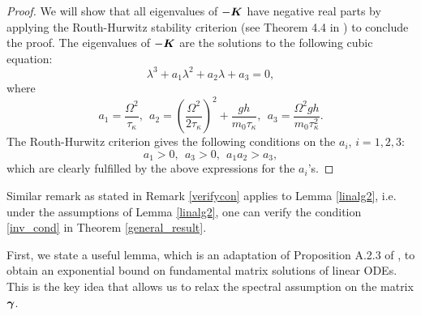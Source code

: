\begin{proof}
We will show that all eigenvalues of $-\boldsymbol{K}$ have negative real parts by applying the Routh-Hurwitz stability criterion (see Theorem 4.4 in \cite{allen2007introduction}) to conclude the proof. The eigenvalues of $-\boldsymbol{K}$ are the solutions to the following cubic equation:
\begin{equation}\lambda^3 + a_{1} \lambda^2 + a_{2} \lambda + a_{3} = 0, \end{equation}
where \begin{equation}a_{1} = \frac{\Omega^2}{\tau_{\kappa}}, \ \ a_{2} = \left(\frac{\Omega^2}{2\tau_{\kappa}}\right)^2 + \frac{gh}{m_{0}\tau_{\kappa}}, \ \ a_{3} = \frac{\Omega^2 gh}{m_{0}\tau_{\kappa}^2}.\end{equation}
The Routh-Hurwitz criterion gives the following conditions on the $a_{i}$, $i=1,2,3$: 
\begin{equation}a_{1} > 0, \ \ a_{3} > 0, \ \ a_{1}a_{2} > a_{3}, \end{equation} which are clearly fulfilled by the above expressions for the $a_{i}$'s. 
\end{proof}

\begin{remark} \label{verifycon2} Similar remark as stated in Remark \ref{verifycon} applies to Lemma \ref{linalg2}, i.e. under the assumptions of Lemma \ref{linalg2}, one can verify the condition \eqref{inv_cond} in Theorem \ref{general_result}.
\end{remark}




First, we state a useful lemma, which is an adaptation of Proposition A.2.3 of \cite{kabanov2013two}, to obtain an exponential bound on fundamental matrix solutions of linear ODEs. This is the key idea that allows us to relax the spectral assumption on the matrix $\boldsymbol{\gamma}$. 


 

